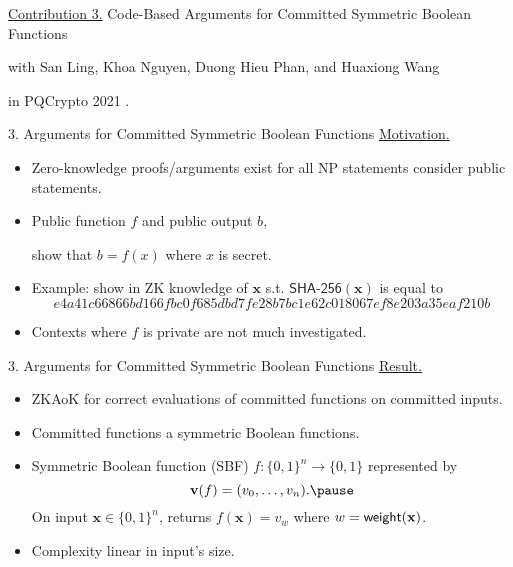 \begin{frame}
	\underline{Contribution 3.} Code-Based Arguments for Committed Symmetric Boolean Functions
	
	{\small with San Ling, Khoa Nguyen, Duong Hieu Phan, and Huaxiong Wang}
	
	in PQCrypto 2021 \cite{LingNPTW21}.
\end{frame}

\begin{frame}{3. Arguments for Committed Symmetric Boolean Functions}
	\underline{Motivation.} \pause
	\begin{itemize}
		\item Zero-knowledge proofs/arguments exist for all NP statements consider public statements.\pause
		\item Public function $f$ and public output $b$, \pause
		
		show that $b = f(x)$ where $x$ is secret.\pause
		\item Example: show in ZK knowledge of $\mathbf{x}$ s.t. $\textsf{SHA-256}(\mathbf{x})$ is equal to\pause
		{\footnotesize \begin{equation*}
			e4a41c66866bd166fbc0f685dbd7fe28b7bc1e62c018067ef8e203a35eaf210b
		\end{equation*}}\pause
		\item Contexts where $f$ is private are not much investigated.
	\end{itemize}
\end{frame} 
\begin{frame}{3. Arguments for Committed Symmetric Boolean Functions}
	\underline{Result.}\pause
	\begin{itemize}
		\item ZKAoK for correct evaluations of committed functions on committed inputs.\pause
		\item Committed functions a symmetric Boolean functions.\pause
		\item Symmetric Boolean function (SBF) $f : \{0,1\}^n \to \{0,1\}$ represented by \pause
		\begin{equation*}
			\mathbf{v}(f) = (v_0, \dots, v_n).\pause
		\end{equation*}
		On input $\mathbf{x} \in \{0,1\}^n$, returns $f(\mathbf{x}) = v_w$ where $w = \mathsf{weight}(\mathbf{x})$.\pause
		\item Complexity linear in input's size.
	\end{itemize}
\end{frame}

